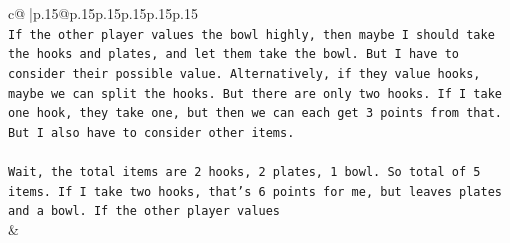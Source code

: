 \documentclass{article}
\begin{document}
{\begin{supertabular}{c@{$\;$}|p{.15\linewidth}@{}p{.15\linewidth}p{.15\linewidth}p{.15\linewidth}p{.15\linewidth}p{.15\linewidth}}
{{{\\ 
\texttt{If the other player values the bowl highly, then maybe I should take the hooks and plates, and let them take the bowl. But I have to consider their possible value. Alternatively, if they value hooks, maybe we can split the hooks. But there are only two hooks. If I take one hook, they take one, but then we can each get 3 points from that. But I also have to consider other items.} \\
\\ 
\texttt{Wait, the total items are 2 hooks, 2 plates, 1 bowl. So total of 5 items. If I take two hooks, that's 6 points for me, but leaves plates and a bowl. If the other player values} \\
            }
        }
    }
    & \\ \\


\end{supertabular}}
\end{document}
